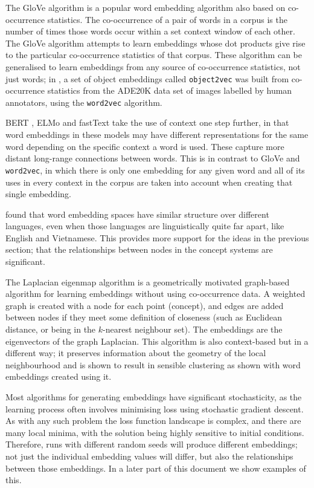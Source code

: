 The GloVe \cite{pennington2014glove} algorithm is a popular word embedding algorithm also based on co-occurrence statistics. The co-occurrence of a pair of words in a corpus is the number of times those words occur within a set context window of each other. The GloVe algorithm attempts to learn embeddings whose dot products give rise to the particular co-occurrence statistics of that corpus. These algorithm can be generalised to learn embeddings from any source of co-occurrence statistics, not just words; in \cite{CoocurrenceVisionLanguage2021}, a set of object embeddings called \texttt{object2vec} was built from co-occurrence statistics from the ADE20K data set \cite{ADE20K} of images labelled by human annotators, using the \texttt{word2vec} algorithm. 

BERT \cite{BERT}, ELMo \cite{ELMo} and fastText \cite{FastText} take the use of context one step further, in that word embeddings in these models may have different representations for the same word depending on the specific context a word is used. These capture more distant long-range connections between words. This is in contrast to GloVe and \texttt{word2vec}, in which there is only one embedding for any given word and all of its uses in every context in the corpus are taken into account when creating that single embedding. 

\cite{MikolovMachineTranslation} found that word embedding spaces have similar structure over different languages, even when those languages are linguistically quite far apart, like English and Vietnamese. This provides more support for the ideas in the previous section; that the relationships between nodes in the concept systems are significant. 

The Laplacian eigenmap algorithm \cite{LaplacianEigenmaps} is a geometrically motivated graph-based algorithm for learning embeddings without using co-occurrence data. A weighted graph is created with a node for each point (concept), and edges are added between nodes if they meet some definition of closeness (such as Euclidean distance, or being in the $k$-nearest neighbour set). The embeddings are the eigenvectors of the graph Laplacian. This algorithm is also context-based but in a different way; it preserves information about the geometry of the local neighbourhood and is shown to result in sensible clustering as shown with word embeddings created using it. 

Most algorithms for generating embeddings have significant stochasticity, as the learning process often involves minimising loss using stochastic gradient descent. As with any such problem the loss function landscape is complex, and there are many local minima, with the solution being highly sensitive to initial conditions. Therefore, runs with different random seeds will produce different embeddings; not just the individual embedding values will differ, but also the relationships between those embeddings. In a later part of this document we show examples of this. 

